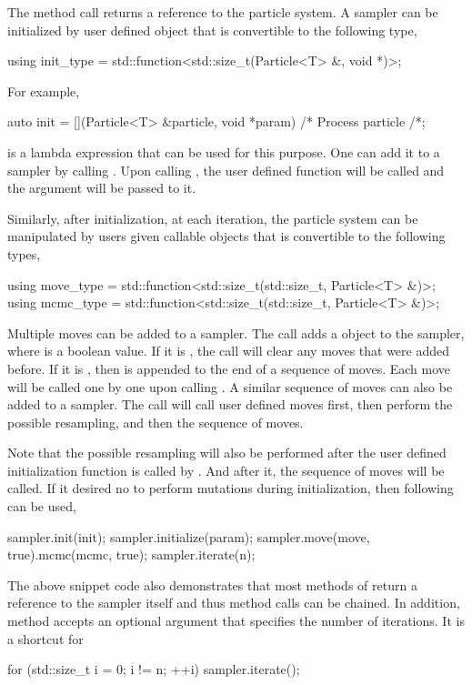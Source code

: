 \documentclass[11pt,bib,mint,hyper,altcolor]{marticle}
\begin{document}
The method call  returns a reference to the
particle system. A sampler can be initialized by user defined object that is
convertible to the following type,
\begin{cppcode}
  using init_type = std::function<std::size_t(Particle<T> &, void *)>;
\end{cppcode}
For example,
\begin{cppcode}
  auto init = [](Particle<T> &particle, void *param) { /* Process particle /*};
\end{cppcode}
is a \cppoo lambda expression that can be used for this purpose. One can add it
to a sampler by calling . Upon calling
, the user defined function
 will be called and the argument  will be
passed to it.

Similarly, after initialization, at each iteration, the particle system can be
manipulated by users given callable objects that is convertible to the
following types,
\begin{cppcode}
  using move_type = std::function<std::size_t(std::size_t, Particle<T> &)>;
  using mcmc_type = std::function<std::size_t(std::size_t, Particle<T> &)>;
\end{cppcode}
Multiple moves can be added to a sampler. The call
 adds a  object to
the sampler, where  is a boolean value. If it is
, the call will clear any moves that were added before. If it
is , then  is appended to the end of a sequence
of moves. Each move will be called one by one upon calling
. A similar sequence of \mcmc moves can also be
added to a sampler. The call  will call user
defined moves first, then perform the possible resampling, and then the
sequence of \mcmc moves.

Note that the possible resampling will also be performed after the user defined
initialization function is called by . And
after it, the sequence of \mcmc moves will be called. If it desired no to
perform mutations during initialization, then following can be used,
\begin{cppcode}
  sampler.init(init);
  sampler.initialize(param);
  sampler.move(move, true).mcmc(mcmc, true);
  sampler.iterate(n);
\end{cppcode}
The above snippet code also demonstrates that most methods of
 return a reference to the sampler itself and thus method
calls can be chained. In addition, method 
accepts an optional argument that specifies the number of iterations. It is a
shortcut for
\begin{cppcode}
  for (std::size_t i = 0; i != n; ++i)
      sampler.iterate();
\end{cppcode}
\end{document}
